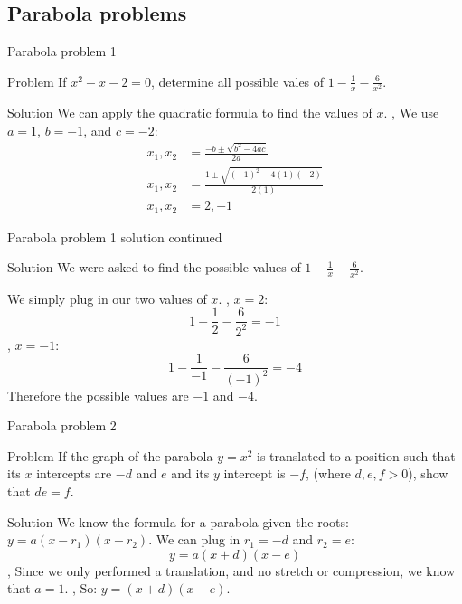 \subsection{Parabola problems}
\begin{namedframe}{Parabola problem 1}
	\begin{exampleblock}{Problem}
		If $x^2 - x - 2 = 0$, determine all possible vales of $1 - \frac{1}{x} - \frac{6}{x^2}$.
	\end{exampleblock}
	\pause
	\begin{block}{Solution}
		We can apply the quadratic formula to find the values of $x$.
		\sep
		We use $a = 1$, $b = -1$, and $ c = -2$:
		\pause
		\begin{align*}
			x_1, x_2 &= \frac{-b \pm \sqrt{b^2 - 4ac}}{2a}\\
			x_1, x_2 &= \frac{1 \pm \sqrt{(-1)^2 - 4(1)(-2)}}{2(1)}\\
			x_1, x_2 &= 2, -1
		\end{align*}
	\end{block}
\end{namedframe}
\begin{namedframe}{Parabola problem 1 solution continued}
	\begin{block}{Solution}
		We were asked to find the possible values of $1 - \frac{1}{x} - \frac{6}{x^2}$.

		We simply plug in our two values of $x$.
		\sep
		$x = 2$:
		\[1 - \frac{1}{2} - \frac{6}{2^2} = -1\]
		\sep
		$x = -1$:
		\[1 - \frac{1}{-1} - \frac{6}{(-1)^2} = -4\]
		\pause
		Therefore the possible values are $-1$ and $-4$.
	\end{block}
\end{namedframe}
\begin{namedframe}{Parabola problem 2}
	\begin{exampleblock}{Problem}
		If the graph of the parabola $y = x^2$ is translated to a position such that its $x$ intercepts are $-d$ and $e$ and its $y$ intercept is $-f$, (where $d, e, f > 0$), show that $de = f$.
	\end{exampleblock}
	\pause
	\begin{block}{Solution}
		We know the formula for a parabola given the roots: $y = a(x - r_1)(x - r_2)$.
		\pause
		We can plug in $r_1 = -d$ and $r_2 = e$:
		\[y = a(x + d)(x - e)\]
		\sep
		Since we only performed a translation, and no stretch or compression, we know that $a = 1$.
		\sep
		So: $y = (x + d)(x - e)$.
	\end{block}
\end{namedframe}
